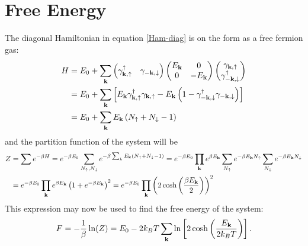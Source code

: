 \section{Free Energy}
The diagonal Hamiltonian in equation \eqref{Ham-diag} is on the form as a free fermion gas:
\begin{equation}
\begin{split}
    H &= E_0 + \sum_{\mathbf{k}} 
    \begin{pmatrix} \gamma_{\bf{k},\uparrow}^{\dagger} & \gamma_{-\bf{k},\downarrow} \end{pmatrix}
    \begin{pmatrix}  E_{\mathbf{k}} & 0 \\ 0 & -E_{\mathbf{k}} \end{pmatrix}
    \begin{pmatrix} \gamma_{\bf{k},\uparrow} \\ \gamma_{-\bf{k},\downarrow}^{\dagger} \end{pmatrix}\\
    &=E_0 + \sum_{\mathbf{k}}\left[ E_{\mathbf{k}}\gamma_{\bf{k},\uparrow}^{\dagger} \gamma_{\bf{k},\uparrow} - E_{\mathbf{k}}\left(1-\gamma_{-\bf{k},\downarrow}^{\dagger}\gamma_{-\bf{k},\downarrow}\right)\right]\\
    &= E_0 + \sum_{\mathbf{k}} E_{\mathbf{k}}\left(N_{\uparrow} + N_{\downarrow} -1\right)
\end{split}
\end{equation}
and the partition function of the system will be
\begin{equation}
\begin{split}
    Z &= \sum e^{-\beta H} = e^{-\beta E_0} \sum_{N_{\uparrow}, N_{\downarrow}} e^{-\beta\sum_kE_{\mathbf{k}}(N_{\uparrow}+N_{\downarrow}-1)} = e^{-\beta E_0} \prod_{\mathbf{k}} e^{\beta E_{\mathbf{k}}}\sum_{N_{\uparrow}} e^{-\beta E_{\mathbf{k}}N_{\uparrow}}\sum_{N_{\downarrow}} e^{-\beta E_{\mathbf{k}}N_{\downarrow}} \\
    &=e^{-\beta E_0} \prod_{\mathbf{k}} e^{\beta E_{\mathbf{k}}}\left(1 + e^{-\beta E_{\mathbf{k}}}\right)^2 = e^{-\beta E_0}\prod_{\mathbf{k}} \left(2\cosh\left(\frac{\beta E_{\mathbf{k}}}{2}\right)\right)^2
\end{split}
\end{equation}
This expression may now be used to find the free energy of the system:
\begin{equation}
    F = -\frac{1}{\beta}\ln(Z)  = E_0 -2k_BT\sum_{\mathbf{k}} \ln\left[2\cosh\left(\frac{E_{\mathbf{k}}}{2k_BT}\right)\right].
\label{FreeEnergy}
\end{equation}
